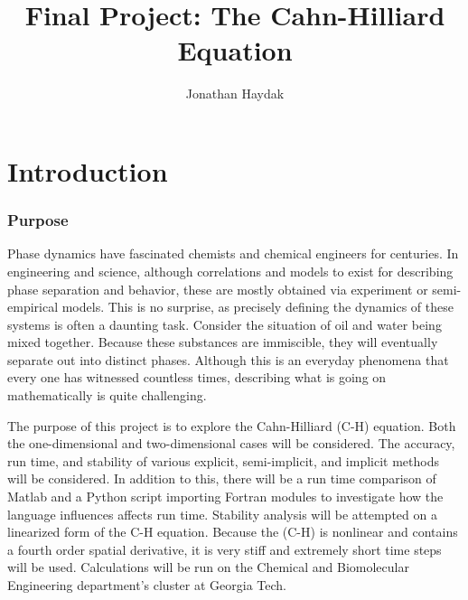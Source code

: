 \documentclass[]{article}
\title{Final Project: The Cahn-Hilliard Equation}
\author{Jonathan Haydak}
\theoremstyle{definition}
\numberwithin{equation}{section}
\numberwithin{equation}{section}
\begin{document}
	\maketitle
	\setlength\cellspacetoplimit{4pt}
	\setlength\cellspacebottomlimit{4pt}
	\tableofcontents
	\newcommand{\dydx}[2]{\frac{\text{d}{#1}}{\text{d} {#2}}}
	\newcommand{\der}[1]{\frac{\partial}{\partial {#1}}}
	\part{Introduction}
	\section{Purpose}
	Phase dynamics have fascinated chemists and chemical engineers for centuries. In engineering and science, although correlations and models to exist for describing phase separation and behavior, these are mostly obtained via experiment or semi-empirical models. This is no surprise, as precisely defining the dynamics of these systems is often a daunting task. Consider the situation of oil and water being mixed together. Because these substances are immiscible, they will eventually separate out into distinct phases. Although this is an everyday phenomena that every one has witnessed countless times, describing what is going on mathematically is quite challenging. 
	
	The purpose of this project is to explore the Cahn-Hilliard (C-H) equation. Both the one-dimensional and two-dimensional cases will be considered. The accuracy, run time, and stability of various explicit, semi-implicit, and implicit methods will be considered. In addition to this, there will be a run time comparison of Matlab and a Python script importing Fortran modules to investigate how the language influences affects run time. Stability analysis will be attempted on a linearized form of the C-H equation. Because the (C-H) is nonlinear and contains a fourth order spatial derivative, it is very stiff and extremely short time steps will be used. Calculations will be run on the Chemical and Biomolecular Engineering department's cluster at Georgia Tech.
\end{document}
